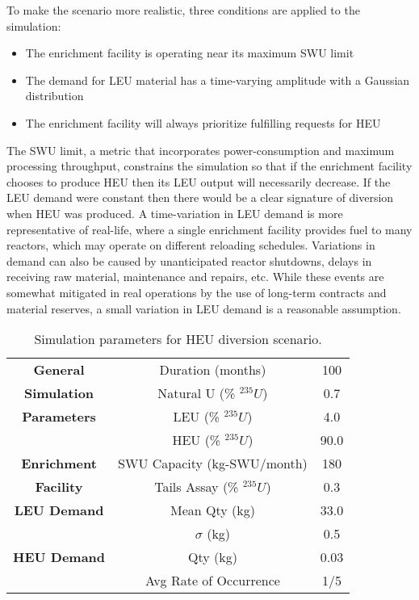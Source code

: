 To make the scenario more realistic, three conditions are applied to the simulation:
\begin{itemize}
\item{The enrichment facility is operating near its maximum \gls{SWU} limit}
\item{The demand for \gls{LEU} material has a time-varying amplitude with a Gaussian distribution}
\item{The enrichment facility will always prioritize fulfilling requests for \gls{HEU}}
\end{itemize}
The \gls{SWU} limit, a metric that incorporates power-consumption and maximum processing throughput, constrains the simulation so that if the enrichment facility chooses to produce \gls{HEU} then its \gls{LEU} output will necessarily decrease.  If the \gls{LEU} demand were constant then there would be a clear signature of diversion when \gls{HEU} was produced.  A time-variation in \gls{LEU} demand is more representative of real-life, where a single enrichment facility provides fuel to many reactors, which may operate on different reloading schedules. Variations in demand can also be caused by unanticipated reactor shutdowns, delays in receiving raw material, maintenance and repairs, etc.  While these events are somewhat mitigated in real operations by the use of long-term contracts and material reserves, a small variation in \gls{LEU} demand is a reasonable assumption.

\begin{table}
\centering
\begin{tabular}{|c|c|c|}
\hline
\textbf{General}    & Duration (months)       & 100  \\
\textbf{Simulation} & Natural U (\% $^{235}U$) & 0.7  \\
\textbf{Parameters} & LEU (\% $^{235}U$)       & 4.0  \\
                    & HEU (\% $^{235}U$)       & 90.0 \\
\hline
\textbf{Enrichment} & SWU Capacity (kg-SWU/month) & 180  \\
\textbf{Facility}   & Tails Assay (\% $^{235}U$)   & 0.3  \\
\hline
\textbf{LEU Demand} & Mean Qty (kg)       & 33.0  \\
                    & $\sigma$ (kg)       & 0.5  \\
\hline
\textbf{HEU Demand} & Qty (kg)            & 0.03  \\
                    & Avg Rate of Occurrence & 1/5 \\ 
\hline
\end{tabular}
\caption{Simulation parameters for \gls{HEU} diversion scenario.}
\label{tab:sim_params}
\end{table}


